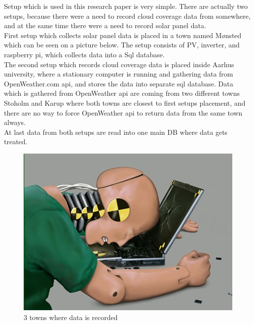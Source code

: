 Setup which is used in this research paper is very simple. There are actually two setups, because there were a need to record cloud coverage data from somewhere, and at the same time there were a need to record solar panel data.\\ 
First setup which collects solar panel data is placed in a town named Mønsted which can be seen on a picture below. The setup consists of  PV, inverter, and raspberry pi, which collects data into a Sql database. \\
The second setup which records cloud coverage data is placed inside Aarhus university, where a stationary computer is running and gathering data from OpenWeather.com api, and stores the data into separate sql database. Data which is gathered from OpenWeather api are coming from two different towns Stoholm and Karup where both towns are closest to first setups placement, and there are no way to force OpenWeather api to return data from the same town always.\\
At last data from both setups are read into one main DB where data gets treated. 

\begin{figure}[h]
  \centering
 \includegraphics{dummy.jpg}
  \caption{3 towns where data is recorded}
      \label{fig:MapsPicture}
\end{figure}
